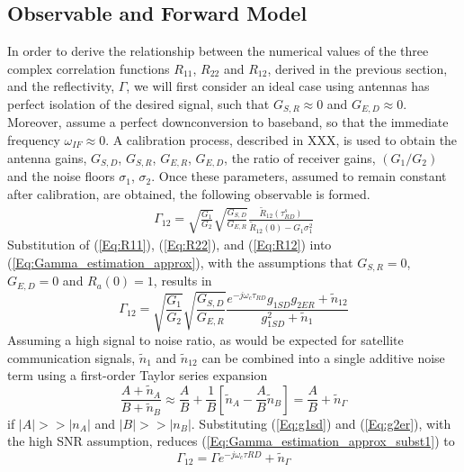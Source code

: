 \documentclass[draftcls,onecolumn]{IEEEtran}  %
\begin{document}
\subsection{Observable and Forward Model}
In order to derive the relationship between the numerical values of the three complex correlation functions $R_{11}$, $R_{22}$ and $R_{12}$, derived in the previous section, and the reflectivity, $\Gamma$, we will first consider an ideal case using  
antennas has perfect isolation of the desired signal, such that
 $G_{S,R}\approx 0 $ and $G_{E,D}\approx 0$. 
Moreover, assume a perfect downconversion to baseband, so that the immediate frequency $\omega_{IF} \approx 0$. 
A calibration process, described in XXX,  is used to obtain the antenna gains, $G_{S,D}$, $G_{S,R}$, $G_{E,R}$, $G_{E,D}$, the ratio of receiver gains, $(G_1/G_2)$ and the noise floors $\sigma_1$, $\sigma_2$. 
Once these parameters, assumed to remain constant after calibration, are obtained, the following observable is formed. 
\begin{eqnarray}
 \Gamma_{12} =	\sqrt{\frac{G_1}{G_2}}\sqrt{\frac{G_{S,D}}{G_{E,R}}} \frac{\tilde{R}_{12}(\tau^s_{RD})}{\tilde{R}_{12}(0)-G_1\sigma_1^2}  
    \label{Eq:Gamma_estimation_approx}
\end{eqnarray}
Substitution of (\ref{Eq:R11}), (\ref{Eq:R22}), and (\ref{Eq:R12}) into
(\ref{Eq:Gamma_estimation_approx}), with the assumptions that $G_{S,R}=0$, 
$G_{E,D}=0$ and $R_a(0)=1$, results in
\begin{equation}
\Gamma_{12} = \sqrt{\frac{G_1}{G_2}} \sqrt{\frac{G_{S,D}}{G_{E,R}}} 
  \frac{e^{-j \omega_c \tau_{RD}} g_{1SD} g_{2ER} + \tilde{n}_{12}}
     {g_{1SD}^2 + \tilde{n}_1}
     \label{Eq:Gamma_estimation_approx_subst1}
\end{equation}
Assuming a high signal to noise ratio, as would be expected for satellite communication signals, $\tilde{n}_1$ and $\tilde{n}_{12}$ can be combined into a single additive noise term using a first-order Taylor series expansion
\begin{equation}
    \frac{A+\tilde{n}_{A}}{B+\tilde{n}_B} \approx \frac{A}{B} + 
   \frac{1}{B}\left[ \tilde{n}_{A} - \frac{A}{B}\tilde{n}_B\right] =\frac{A}{B}    +\tilde{n}_{\Gamma}
\end{equation}
if $|A|>> |n_A|$ and $|B| >> |n_B|$.
Substituting (\ref{Eq:g1sd}) and (\ref{Eq:g2er}), with the high SNR assumption, reduces (\ref{Eq:Gamma_estimation_approx_subst1}) to 
\begin{equation}
    \Gamma_{12} = \Gamma e^{-j \omega_c \tau{RD}} + \tilde{n}_\Gamma
\end{equation}
\end{document}
